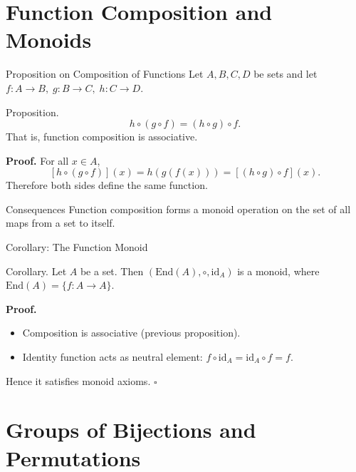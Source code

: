 \documentclass[11pt,aspectratio=43,ignorenonframetext,t]{beamer}
\begin{document}
\section{Function Composition and Monoids}

\begin{frame}{Proposition on Composition of Functions}
Let \(A,B,C,D\) be sets and let  
\(f:A\to B,\; g:B\to C,\; h:C\to D.\)

\begin{block}{Proposition.}
\[
h \circ (g \circ f) = (h \circ g) \circ f.
\]
That is, function composition is associative.
\end{block}

\textbf{Proof.}
For all \(x\in A\),
\[
[h \circ (g \circ f)](x) = h(g(f(x))) = [(h \circ g) \circ f](x).
\]
Therefore both sides define the same function.

\begin{block}{Consequences}
Function composition forms a monoid operation on the set of all maps from a set to itself.
\end{block}
\end{frame}

\begin{frame}{Corollary: The Function Monoid}
\begin{block}{Corollary.}
Let \(A\) be a set.  
Then \((\text{End}(A), \circ, \mathrm{id}_A)\) is a monoid,  
where \(\text{End}(A) = \{ f : A \to A \}\).
\end{block}

\textbf{Proof.}
\begin{itemize}
  \item Composition is associative (previous proposition).
  \item Identity function acts as neutral element: \(f\circ\mathrm{id}_A = \mathrm{id}_A\circ f = f.\)
\end{itemize}
Hence it satisfies monoid axioms. \(\square\)
\end{frame}

\section{Groups of Bijections and Permutations}
\end{document}
